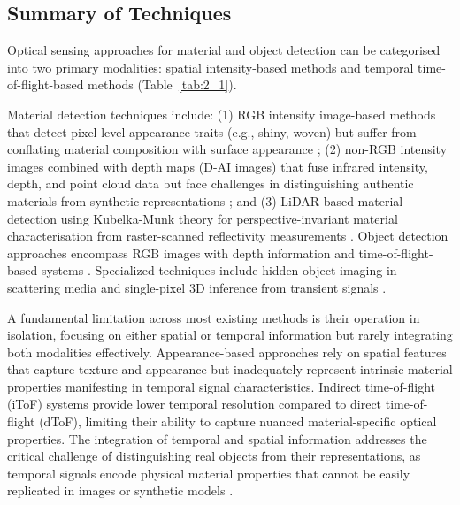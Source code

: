 \documentclass[12pt,a4paper,oneside]{report}
\begin{document}
\subsection{Summary of Techniques}
\label{subsec:signal_image_processing_summary}

Optical sensing approaches for material and object detection can be categorised into two primary modalities: spatial intensity-based methods and temporal time-of-flight-based methods (Table~\ref{tab:2_1}).

Material detection techniques include: (1) RGB intensity image-based methods that detect pixel-level appearance traits (e.g., shiny, woven) but suffer from conflating material composition with surface appearance \cite{schwartz2013,sharan2013,depthpro2024}; (2) non-RGB intensity images combined with depth maps (D-AI images) that fuse infrared intensity, depth, and point cloud data but face challenges in distinguishing authentic materials from synthetic representations \cite{sharma2023}; and (3) LiDAR-based material detection using Kubelka-Munk theory for perspective-invariant material characterisation from raster-scanned reflectivity measurements \cite{yang2024}. Object detection approaches encompass RGB images with depth information \cite{chen2024} and time-of-flight-based systems \cite{tafone2023,fasolino2024,yang2023}. Specialized techniques include hidden object imaging in scattering media \cite{lyons2019} and single-pixel 3D inference from transient signals \cite{turpin2019,jungerman2022}.

A fundamental limitation across most existing methods is their operation in isolation, focusing on either spatial or temporal information but rarely integrating both modalities effectively. Appearance-based approaches rely on spatial features that capture texture and appearance but inadequately represent intrinsic material properties manifesting in temporal signal characteristics. Indirect time-of-flight (iToF) systems provide lower temporal resolution compared to direct time-of-flight (dToF), limiting their ability to capture nuanced material-specific optical properties. The integration of temporal and spatial information addresses the critical challenge of distinguishing real objects from their representations, as temporal signals encode physical material properties that cannot be easily replicated in images or synthetic models \cite{su2016,becker2023,tafone2023}.
\end{document}
